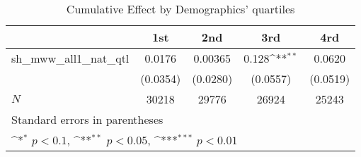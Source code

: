 \begin{table}[htbp]\centering
\def\sym#1{\ifmmode^{#1}\else\(^{#1}\)\fi}
\caption{Cumulative Effect by Demographics' quartiles}
\begin{tabular}{l*{4}{c}}
\hline\hline
            &\multicolumn{1}{c}{1st}&\multicolumn{1}{c}{2nd}&\multicolumn{1}{c}{3rd}&\multicolumn{1}{c}{4rd}\\
\hline
sh\_mww\_all1\_nat\_qtl&      0.0176         &     0.00365         &       0.128\sym{**} &      0.0620         \\
            &    (0.0354)         &    (0.0280)         &    (0.0557)         &    (0.0519)         \\
\hline
\(N\)       &       30218         &       29776         &       26924         &       25243         \\
\hline\hline
\multicolumn{5}{l}{\footnotesize Standard errors in parentheses}\\
\multicolumn{5}{l}{\footnotesize \sym{*} \(p<0.1\), \sym{**} \(p<0.05\), \sym{***} \(p<0.01\)}\\
\end{tabular}
\end{table}
